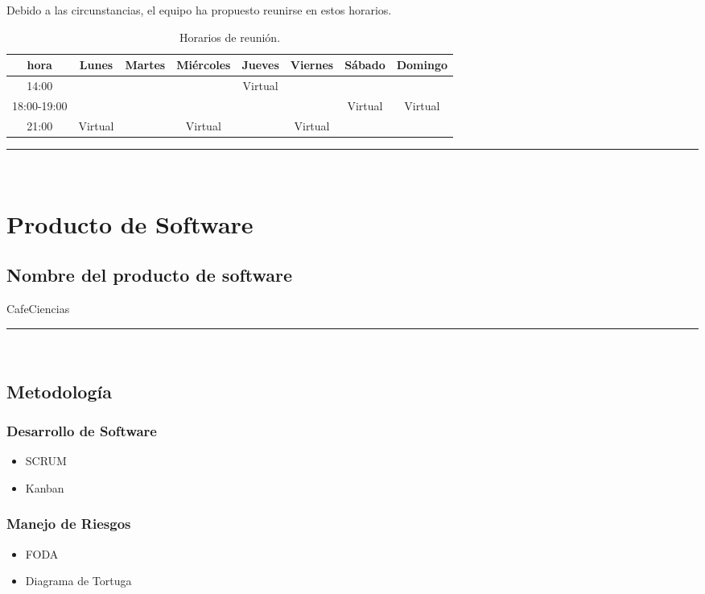 \documentclass{article}
\begin{document}
Debido a las circunstancias, el equipo ha propuesto reunirse en estos horarios.
\begin{center}
  \begin{table}[H]
    \centering
    \begin{tabular}{| c | c | c | c | c | c | c | c | }
      \hline
      hora & Lunes & Martes & Miércoles & Jueves & Viernes & Sábado & Domingo \\
      \hline
      14:00 & & & & Virtual & & & \\ \hline
      18:00-19:00 & & & & &  & Virtual & Virtual  \\ \hline
      21:00 & Virtual & & Virtual & & Virtual & & \\ \hline
    \end{tabular}
    \caption{Horarios de reunión.}
    \label{tabla:horarios}
  \end{table}
\end{center}

\rule{0.8\textwidth}{.8pt}\\

\section*{Producto de Software}

\subsection*{Nombre del producto de software}
CafeCiencias\\

\rule{0.8\textwidth}{.8pt}\\

\subsection*{Metodología}
\subsubsection*{Desarrollo de Software}
\begin{itemize}
\item SCRUM
\item Kanban
\end{itemize}
\subsubsection*{Manejo de Riesgos}
\begin{itemize}
\item FODA
\item Diagrama de Tortuga
\end{itemize}
\end{document}
